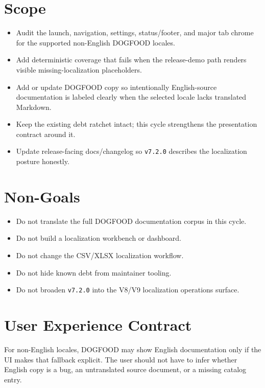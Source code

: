 \section{Scope}\label{record-196-scope}

\begin{itemize}
\tightlist
\item
  Audit the launch, navigation, settings, status/footer, and major tab chrome for the supported non-English DOGFOOD locales.
\item
  Add deterministic coverage that fails when the release-demo path renders visible missing-localization placeholders.
\item
  Add or update DOGFOOD copy so intentionally English-source documentation is labeled clearly when the selected locale lacks translated Markdown.
\item
  Keep the existing debt ratchet intact; this cycle strengthens the presentation contract around it.
\item
  Update release-facing docs/changelog so \texttt{v\allowbreak{}7\allowbreak{}.\allowbreak{}2\allowbreak{}.\allowbreak{}0} describes the localization posture honestly.
\end{itemize}

\section{Non-Goals}\label{record-196-non-goals}

\begin{itemize}
\tightlist
\item
  Do not translate the full DOGFOOD documentation corpus in this cycle.
\item
  Do not build a localization workbench or dashboard.
\item
  Do not change the CSV/XLSX localization workflow.
\item
  Do not hide known debt from maintainer tooling.
\item
  Do not broaden \texttt{v\allowbreak{}7\allowbreak{}.\allowbreak{}2\allowbreak{}.\allowbreak{}0} into the V8/V9 localization operations surface.
\end{itemize}

\section{User Experience Contract}\label{record-196-user-experience-contract}

For non-English locales, DOGFOOD may show English documentation only if the UI makes that fallback explicit. The user should not have to infer whether English copy is a bug, an untranslated source document, or a missing catalog entry.

